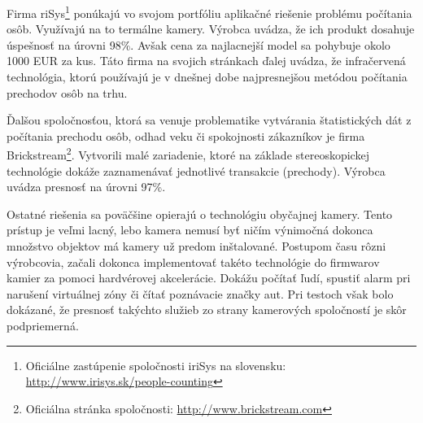 \vspace{8mm}
 
Firma riSys\footnote{Oficiálne zastúpenie spoločnosti iriSys na slovensku: \url{http://www.irisys.sk/people-counting}} ponúkajú vo svojom portfóliu aplikačné riešenie problému počítania osôb. Využívajú na to termálne kamery. Výrobca uvádza, že ich produkt dosahuje úspešnosť na úrovni 98\%. Avšak cena za najlacnejší model sa pohybuje okolo 1000 EUR za kus. Táto firma na svojich stránkach ďalej uvádza, že infračervená technológia, ktorú používajú je v dnešnej dobe najpresnejšou metódou počítania prechodov osôb na trhu. 

Ďalšou spoločnosťou, ktorá sa venuje problematike vytvárania štatistických dát z počítania prechodu osôb, odhad veku či spokojnosti zákazníkov je firma Brickstream\footnote{Oficiálna stránka spoločnosti: \url{http://www.brickstream.com}}. Vytvorili malé zariadenie, ktoré na základe stereoskopickej technológie dokáže zaznamenávať jednotlivé transakcie (prechody). Výrobca uvádza presnosť na úrovni 97\%.


Ostatné riešenia sa poväčšine opierajú o technológiu obyčajnej kamery. Tento prístup je veľmi lacný, lebo kamera nemusí byť ničím výnimočná dokonca množstvo objektov má kamery už predom inštalované. Postupom času rôzni výrobcovia, začali dokonca implementovať takéto technológie do firmwarov kamier za pomoci hardvérovej akcelerácie. Dokážu počítať ľudí, spustiť alarm pri narušení virtuálnej zóny či čítať poznávacie značky aut. Pri testoch však bolo dokázané, že presnosť takýchto služieb zo strany kamerových spoločností je skôr podpriemerná. 





